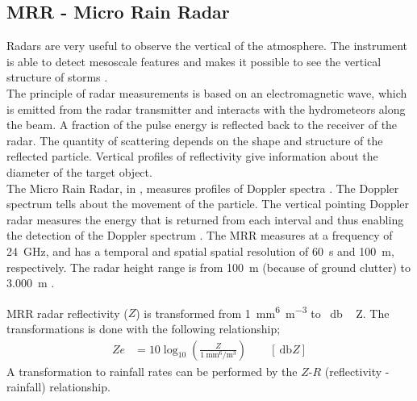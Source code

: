 \subsection{MRR - Micro Rain Radar}\label{sec:MRR}

Radars are very useful to observe the vertical of the atmosphere. The instrument is able to detect mesoscale features and makes it possible to see the vertical structure of storms \citep{markowski_mesoscale_2011}.\\
The principle of radar measurements is based on an electromagnetic wave, which is emitted from the radar transmitter and interacts with the hydrometeors along the beam. A fraction of the pulse energy is reflected back to the receiver of the radar. The quantity of scattering depends on the shape and structure of the reflected particle. 
Vertical profiles of reflectivity give information about the diameter of the target object.
\\
The Micro Rain Radar, in , measures profiles of Doppler spectra \citep{metek_micro_2010}. The Doppler spectrum tells about the movement of the particle. The vertical pointing Doppler radar measures the energy that is returned from each interval and thus enabling the detection of the Doppler spectrum \citep{lecuyer_aos_2017}. The MRR measures at a frequency of \SI{24}{\giga\Hz}, and has a temporal and spatial spatial resolution of \SI{60}{\second} and \SI{100}{\metre}, respectively. The radar height range is from \SI{100}{\metre} (because of ground clutter) to \SI{3.000}{\metre} \citep{metek_micro_2010}.

\noindent 
MRR radar reflectivity ($Z$) is transformed from \SI{1}{\mm^6\per\metre^3} to \SI{}{\decibel\,Z}.
The transformations is done with the following relationship;
\begin{align}
Ze & = 10 \log_{10} \left(\frac{Z}{\SI{1}{\mm^6\per\metre^3}}\right) \qquad [\SI{}{\decibel Z}]
\label{eq:Ze}
\end{align}
A transformation to rainfall rates can be performed by the $Z$-$R$ (reflectivity - rainfall) relationship. 
